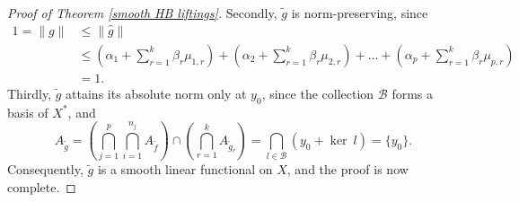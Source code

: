 \documentclass[10pt,a4paper]{amsart}
\begin{document}
\begin{proof}[Proof of Theorem \ref{smooth HB liftings}]
\noindent Secondly, $\widetilde{g}$ is norm-preserving, since
\begin{align*}
1 =\|g\| & \leq \|\widehat{g}\|\\& \leq (\alpha_1+\sum_{r=1}^{k}\beta_{r}\mu_{1,r})+(\alpha_2+\sum_{r=1}^{k}\beta_{r}\mu_{2,r})+\dots+(\alpha_p+\sum_{r=1}^{k}\beta_{r}\mu_{p,r})\\
& =1.
\end{align*}
Thirdly, $\widetilde{g}$ attains its absolute norm only at $y_0$, since the collection $\mathcal{B}$ forms a basis of $X^*$, and
\[
A_{\widetilde{g}}=(\bigcap_{j=1}^{p}\bigcap_{i=1}^{n_j}A_{\widetilde{f}})\cap (\bigcap_{r=1}^{k}A_{\widetilde{g}_{r}}) = \bigcap_{l\in \mathcal{B}} (y_0+\ker~l)=\{y_0\}.
\]
Consequently, $\widetilde{g}$ is a smooth linear functional on $X$, and the proof is now complete.
\end{proof}
\end{document}
